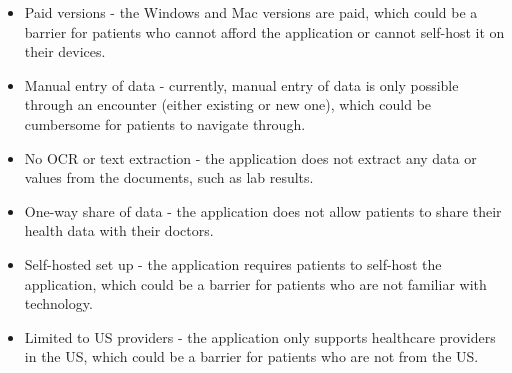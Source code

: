 \begin{itemize}
    \item Paid versions - the Windows and Mac versions are paid, which could be a barrier for patients who cannot afford the application or cannot self-host it on their devices.
    \item Manual entry of data - currently, manual entry of data is only possible through an encounter (either existing or new one), which could be cumbersome for patients to navigate through.
    \item No OCR or text extraction - the application does not extract any data or values from the documents, such as lab results.
    \item One-way share of data - the application does not allow patients to share their health data with their doctors.
    \item Self-hosted set up - the application requires patients to self-host the application, which could be a barrier for patients who are not familiar with technology.
    \item Limited to US providers - the application only supports healthcare providers in the US, which could be a barrier for patients who are not from the US.
\end{itemize}